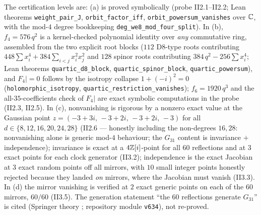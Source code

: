 The certification levels are: (a) is proved symbolically (probe
II2.1--II2.2; Lean theorems \texttt{weight\_pair\_J},
\texttt{orbit\_factor\_iff}, \texttt{orbit\_powersum\_vanishes} over
$\mathbb C$, with the mod-$4$ degree bookkeeping
\texttt{deg\_we8\_mod\_four\_split}).  In (b), $f_4=576\,q^2$ is a
kernel-checked polynomial identity over \emph{any} commutative ring,
assembled from the two explicit root blocks ($112$ D8-type roots
contributing $448\sum x_i^4+384\sum_{i<j}x_i^2x_j^2$ and $128$ spinor
roots contributing $384\,q^2-256\sum x_i^4$; Lean theorems
\texttt{quartic\_d8\_block}, \texttt{quartic\_spinor\_block},
\texttt{quartic\_powersum}), and $F_4|=0$ follows by the isotropy
collapse $1+(-i)^2=0$ (\texttt{holomorphic\_isotropy},
\texttt{quartic\_restriction\_vanishes}); $f_6=1920\,q^3$ and the
all-$35$-coefficients check of $F_4|$ are exact symbolic computations
in the probe (II2.3, II2.5).  In (c), nonvanishing is rigorous by a
nonzero exact value at the Gaussian point
$z=(-3+3i,\,-3+2i,\,-3+2i,\,-3)$ for all
$d\in\{8,12,16,20,24,28\}$ (II2.6 --- honestly including the
non-degrees $16,28$: nonvanishing alone is generic mod-$4$ behaviour;
the $G_{31}$ content is invariance $+$ independence); invariance is
exact at a $4\mathbb Z[i]$-point for all $60$ reflections and at $3$ exact
points for each clock generator (II3.2); independence is the exact
Jacobian at $3$ exact random points off all mirrors, with $10$ small
integer points honestly rejected because they landed \emph{on}
mirrors, where the Jacobian must vanish (II3.3).  In (d) the mirror
vanishing is verified at $2$ exact generic points on each of the
$60$ mirrors, $60/60$ (II3.5).  The generation statement ``the $60$
reflections generate $G_{31}$'' is cited (Springer theory
\cite{Spr74,LT09}; repository module \texttt{v634}), not re-proved.

